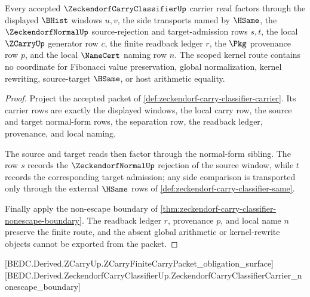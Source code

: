 \begin{theorem}
\label{thm:zeckendorf-carry-classifier-scoped-kernel-route}
Every accepted $\ZeckendorfCarryClassifierUp$ carrier read factors through the displayed $\BHist$ windows $u,v$, the side transports named by $\HSame$, the $\ZeckendorfNormalUp$ source-rejection and target-admission rows $s,t$, the local $\ZCarryUp$ generator row $c$, the finite readback ledger $r$, the $\Pkg$ provenance row $p$, and the local $\NameCert$ naming row $n$. The scoped kernel route contains no coordinate for Fibonacci value preservation, global normalization, kernel rewriting, source-target $\HSame$, or host arithmetic equality.
\end{theorem}
\begin{proof}
Project the accepted packet of \autoref{def:zeckendorf-carry-classifier-carrier}. Its carrier rows are exactly the displayed windows, the local carry row, the source and target normal-form rows, the separation row, the readback ledger, provenance, and local naming.

The source and target reads then factor through the normal-form sibling. The row $s$ records the $\ZeckendorfNormalUp$ rejection of the source window, while $t$ records the corresponding target admission; any side comparison is transported only through the external $\HSame$ rows of \autoref{def:zeckendorf-carry-classifier-same}.

Finally apply the non-escape boundary of \autoref{thm:zeckendorf-carry-classifier-nonescape-boundary}. The readback ledger $r$, provenance $p$, and local name $n$ preserve the finite route, and the absent global arithmetic or kernel-rewrite objects cannot be exported from the packet.
\end{proof}

[BEDC.Derived.ZCarryUp.ZCarryFiniteCarryPacket\_obligation\_surface]
[BEDC.Derived.ZeckendorfCarryClassifierUp.ZeckendorfCarryClassifierCarrier\_nonescape\_boundary]

\begin{closurestatus}{\ZeckendorfCarryClassifierUp}
  \theoryclosure{\publicClosure}
  \formalstatus{\unformalizedV}
\end{closurestatus}
